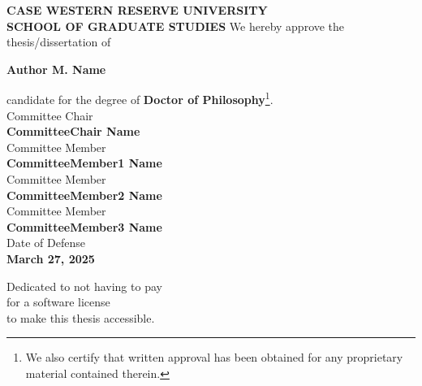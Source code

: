 \documentclass[12pt, oneside]{book}
\newcommand{\authorname}{Author M. Name}
\newcommand{\degreename}{Doctor of Philosophy}
\begin{document}
\newpage
\begin{center}
    \textbf{\MakeUppercase{Case Western Reserve University}}\\
    \textbf{\MakeUppercase{School of Graduate Studies}}
    \vfill
    We hereby approve the thesis/dissertation of \par
    \textbf{\authorname} \par
    candidate for the degree of \textbf{\degreename}\footnote{We also certify that written approval has been obtained for any proprietary material contained therein.}.\\
    \vfill
    Committee Chair \\
    \textbf{CommitteeChair Name}\\
    \vfill
    Committee Member \\
    \textbf{CommitteeMember1 Name}\\
    \vfill
    Committee Member \\
    \textbf{CommitteeMember2 Name}\\
    \vfill
    Committee Member \\
    \textbf{CommitteeMember3 Name}\\
    \vfill
    Date of Defense \\
    \textbf{March 27, 2025}
\end{center}




\clearpage
\begin{center}
    \thispagestyle{empty}
    \vspace*{\fill}
    Dedicated to not having to pay\\
    for a software license\\
    to make this thesis accessible.
    \vspace*{\fill}
\end{center}
\clearpage


%
\end{document}
